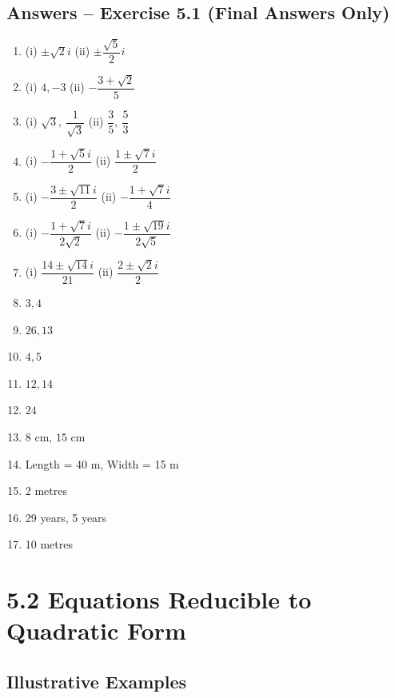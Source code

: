 \documentclass[12pt,a4paper]{article}
\begin{document}
\subsection{Answers -- Exercise 5.1 (Final Answers Only)}

\begin{enumerate}
    \item (i) \( \pm \sqrt{2}i \) \quad (ii) \( \pm \dfrac{\sqrt{5}}{2}i \)
    \item (i) \( 4, -3 \) \quad (ii) \( -\dfrac{3 + \sqrt{2}}{5} \)
    \item (i) \( \sqrt{3},\ \dfrac{1}{\sqrt{3}} \) \quad (ii) \( \dfrac{3}{5},\ \dfrac{5}{3} \)
    \item (i) \( -\dfrac{1 + \sqrt{5}i}{2} \) \quad (ii) \( \dfrac{1 \pm \sqrt{7}i}{2} \)
    \item (i) \( -\dfrac{3 \pm \sqrt{11}i}{2} \) \quad (ii) \( -\dfrac{1 + \sqrt{7}i}{4} \)
    \item (i) \( -\dfrac{1 + \sqrt{7}i}{2\sqrt{2}} \) \quad (ii) \( -\dfrac{1 \pm \sqrt{19}i}{2\sqrt{5}} \)
    \item (i) \( \dfrac{14 \pm \sqrt{14}i}{21} \) \quad (ii) \( \dfrac{2 \pm \sqrt{2}i}{2} \)
    \item \( 3, 4 \)
    \item \( 26, 13 \)
    \item \( 4, 5 \)
    \item \( 12, 14 \)
    \item \( 24 \)
    \item \( 8 \) cm, \( 15 \) cm
    \item Length = 40 m, Width = 15 m
    \item 2 metres
    \item 29 years, 5 years
    \item 10 metres
\end{enumerate}

\section{5.2 Equations Reducible to Quadratic Form}

\subsection{Illustrative Examples}
\end{document}
